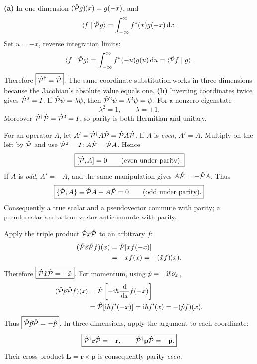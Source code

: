 \textbf{(a)} In one dimension
$(\hat{\mathcal P} g)(x)=g(-x)$, and
\[
\langle f\mid \hat{\mathcal P} g\rangle=\int_{-\infty}^\infty
f^*(x)g(-x)\,\mathrm d x.
\]
Set $u=-x$, reverse integration limits:
\[
\langle f\mid \hat{\mathcal P} g\rangle=
\int_{-\infty}^\infty f^*(-u)g(u)\,\mathrm d u
=\langle \hat{\mathcal P} f\mid g\rangle.
\]
Therefore $\boxed{\hat{\mathcal P}^\dagger=\hat{\mathcal P}}$.
The same coordinate substitution works in
three dimensions because the Jacobian's
absolute value equals one.
\textbf{(b)} Inverting coordinates twice gives
$\hat{\mathcal P}^2=I$. If $\hat{\mathcal P}\psi=\lambda\psi$,
then $\hat{\mathcal P}^2\psi=\lambda^2\psi=\psi$.
For a nonzero eigenstate
\begin{equation}
\boxed{\lambda^2=1,\qquad\lambda=\pm1.}
\end{equation}
Moreover $\hat{\mathcal P}^\dagger\hat{\mathcal P}=\hat{\mathcal P}^2=I$,
so parity is both Hermitian and unitary.

For an operator $A$, let
$A'=\hat{\mathcal P}^\dagger A\hat{\mathcal P}=\hat{\mathcal P} A\hat{\mathcal P}$.
If $A$ is \emph{even}, $A'=A$.
Multiply on the left by $\hat{\mathcal P}$
and use $\hat{\mathcal P}^2=I$: $A\hat{\mathcal P}=\hat{\mathcal P} A$.
Hence
\[
\boxed{[\hat{\mathcal P},A]=0\qquad\text{(even under parity)}.}
\]
If $A$ is \emph{odd}, $A'=-A$,
and the same manipulation gives
$A\hat{\mathcal P}=-\hat{\mathcal P} A$. Thus
\[
\boxed{\{\hat{\mathcal P},A\}\equiv\hat{\mathcal P} A+A\hat{\mathcal P}=0
\qquad\text{(odd under parity)}.}
\]
Consequently a true scalar and
a pseudovector commute with parity;
a pseudoscalar and a true vector
anticommute with parity.

Apply the triple product $\hat{\mathcal P} \hat x\hat{\mathcal P}$
to an arbitrary $f$:
\begin{align}
(\hat{\mathcal P}\hat x\hat{\mathcal P} f)(x)
&=\hat{\mathcal P}[x f(-x)]\\
&=-x f(x)=-(\hat x f)(x).
\end{align}
Therefore $\boxed{\hat{\mathcal P}\hat x\hat{\mathcal P}=-\hat x}$.
For momentum, using $\hat p=-\mathrm i\hbar\partial_x$,
\begin{align}
(\hat{\mathcal P}\hat p\hat{\mathcal P} f)(x)
&=\hat{\mathcal P}\left[-\mathrm i\hbar\frac{\,\mathrm d}{\,\mathrm d x}
f(-x)\right]\\
&=\hat{\mathcal P}[\mathrm i\hbar f'(-x)]
=\mathrm i\hbar f'(x)=-(\hat p f)(x).
\end{align}
Thus $\boxed{\hat{\mathcal P}\hat p\hat{\mathcal P}=-\hat p}$.
In three dimensions, apply the argument
to each coordinate:
\begin{equation}
\boxed{\hat{\mathcal P}^\dagger\mathbf r\hat{\mathcal P}=-\mathbf r,\qquad
\hat{\mathcal P}^\dagger\mathbf p\hat{\mathcal P}=-\mathbf p.}
\end{equation}
Their cross product
$\mathbf L=\mathbf r\times\mathbf p$
is consequently parity \emph{even}.

